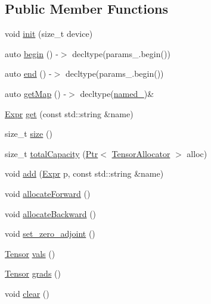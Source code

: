\subsection*{Public Member Functions}
\begin{DoxyCompactItemize}
\item 
void \hyperlink{classmarian_1_1Parameters_a764b6a9878d9384a57d8999ac6858473}{init} (size\+\_\+t device)
\item 
auto \hyperlink{classmarian_1_1Parameters_aa4455a5d1f52b116da7612db0d0cff22}{begin} () -\/$>$ decltype(params\+\_\+.\+begin())
\item 
auto \hyperlink{classmarian_1_1Parameters_a0da2b76e9b36fc6d4f26320bf09fef96}{end} () -\/$>$ decltype(params\+\_\+.\+begin())
\item 
auto \hyperlink{classmarian_1_1Parameters_ac057d264e9eea0d345ad8f6a62f3fe69}{get\+Map} () -\/$>$ decltype(\hyperlink{classmarian_1_1Parameters_a2581f2bfa392634516ee2cfad9bbed73}{named\+\_\+})\&
\item 
\hyperlink{namespacemarian_a498d8baf75b754011078b890b39c8e12}{Expr} \hyperlink{classmarian_1_1Parameters_a08bd38120ba9a14fa2d66fcee53cda76}{get} (const std\+::string \&name)
\item 
size\+\_\+t \hyperlink{classmarian_1_1Parameters_a3f99cdf63455697019da8da8d038a896}{size} ()
\item 
size\+\_\+t \hyperlink{classmarian_1_1Parameters_a7fb3719a18566cf659baa929fcbfcc5d}{total\+Capacity} (\hyperlink{namespacemarian_ad1a373be43a00ef9ce35666145137b08}{Ptr}$<$ \hyperlink{classmarian_1_1TensorAllocator}{Tensor\+Allocator} $>$ alloc)
\item 
void \hyperlink{classmarian_1_1Parameters_a9970eb31a8871d95030e1430a253f010}{add} (\hyperlink{namespacemarian_a498d8baf75b754011078b890b39c8e12}{Expr} p, const std\+::string \&name)
\item 
void \hyperlink{classmarian_1_1Parameters_a9603af4faeb75926c9a0efd7ad3189ca}{allocate\+Forward} ()
\item 
void \hyperlink{classmarian_1_1Parameters_a350f3682c45b13d7a59a61e6cad14f57}{allocate\+Backward} ()
\item 
void \hyperlink{classmarian_1_1Parameters_ae99e7884529b5c8e63b151ffc2e863c8}{set\+\_\+zero\+\_\+adjoint} ()
\item 
\hyperlink{namespacemarian_a88b71ec34bb354564cddc24eb80f7e14}{Tensor} \hyperlink{classmarian_1_1Parameters_aabd1c44b5f667c5aee05b13a7ac7e17d}{vals} ()
\item 
\hyperlink{namespacemarian_a88b71ec34bb354564cddc24eb80f7e14}{Tensor} \hyperlink{classmarian_1_1Parameters_a90ec020dc180bca8c6176fc77be33c8d}{grads} ()
\item 
void \hyperlink{classmarian_1_1Parameters_a1eaa70607c906a3fc88361e81366735d}{clear} ()
\end{DoxyCompactItemize}
